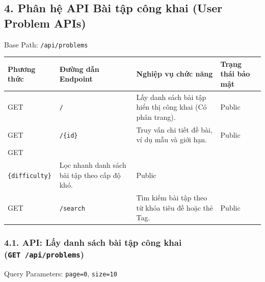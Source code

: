 \documentclass[12pt,a4paper]{article}
\makeatletter
\renewcommand{\_}{\BreakableUnderscore}
\newcommand{\tablecelllines}[1]{\begin{tabular}[t]{@{}l@{}}#1\end{tabular}}
\makeatother
\begin{document}
\subsection{4. Phân hệ API Bài tập công khai (User Problem APIs)}

Base Path: \texttt{/api/problems}

\begin{longtable}[]{
  |>{\raggedright\arraybackslash}p{}
  |>{\raggedright\arraybackslash}p{}
  |>{\raggedright\arraybackslash}p{}
  |>{\raggedright\arraybackslash}p{}|}
\hline\rowcolor{tableHeader}
\begin{minipage}[b]{\linewidth}\raggedright
Phương thức
\end{minipage} & \begin{minipage}[b]{\linewidth}\raggedright
Đường dẫn Endpoint
\end{minipage} & \begin{minipage}[b]{\linewidth}\raggedright
Nghiệp vụ chức năng
\end{minipage} & \begin{minipage}[b]{\linewidth}\raggedright
Trạng thái bảo mật
\end{minipage} \\
\hline
\endhead
\hline
\endlastfoot
GET & \texttt{/} & Lấy danh sách bài tập hiển thị công khai (Có phân trang). & Public \\
\hline
GET & \texttt{/\{id\}} & Truy vấn chi tiết đề bài, ví dụ mẫu và giới hạn. & Public \\
\hline
GET & \tablecelllines{\texttt{/difficulty/}\\\texttt{\{difficulty\}}} & Lọc nhanh danh sách bài tập theo cấp độ khó. & Public \\
\hline
GET & \texttt{/search} & Tìm kiếm bài tập theo từ khóa tiêu đề hoặc thẻ Tag. & Public \\
\hline
\end{longtable}

\subsubsection{\texorpdfstring{4.1. API: Lấy danh sách bài tập công khai (\texttt{GET\ /api/problems})}{4.1. API: Lấy danh sách bài tập công khai (GET /api/problems)}}

Query Parameters: \texttt{page=0}, \texttt{size=10}
\end{document}

